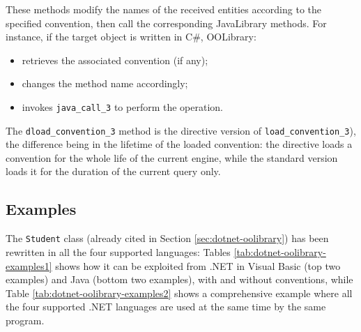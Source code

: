 \noindent These methods modify the names of the received entities according to the specified convention, then call the corresponding JavaLibrary methods.
For instance, if the target object is written in C\#, OOLibrary:
\begin{itemize}
  \item retrieves the associated convention (if any);
  \item changes the method name accordingly;
  \item invokes \texttt{java\_call\_3} to perform the operation.
\end{itemize}

\noindent The \texttt{dload\_convention\_3} method is the directive version of \texttt{load\_convention\_3}), the difference being in the lifetime of the loaded convention: the directive loads a convention for the whole life of the current \tuprolog{} engine, while the standard version loads it for the duration of the current query only.

\subsection{Examples}
\label{sec:dotnet-oolibrary-examples}


The \texttt{Student} class (already cited in Section \ref{sec:dotnet-oolibrary}) has been rewritten in all the four supported languages:
Tables \ref{tab:dotnet-oolibrary-examples1} shows how it can be exploited from \tuprolog{}.NET in Visual Basic (top two examples) and Java (bottom two examples), with and without conventions, while Table \ref{tab:dotnet-oolibrary-examples2} shows a comprehensive example where all the four supported .NET languages are used at the same time by the same \tuprolog{} program.

